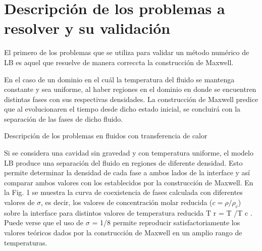 ﻿\chapter{Descripción de los problemas a resolver y su validación}
\graphicspath{{figs/cap4/}}
\label{cap4}

El primero de los problemas que se utiliza para validar un método numérico de LB es aquel que resuelve de manera correccta la construcción de Maxwell.

En el caso de un dominio en el cuál la temperatura del fluido se mantenga constante y sea uniforme, al haber regiones en el dominio en donde se encuentren distintas fases con sus respectivas densidades. La construcción de Maxwell predice que al evolucionaren el tiempo desde dicho estado inicial, se concluirá con la separación de las fases de dicho fluido.



Descripción de los problemas en fluidos con transferencia de calor

Si se considera una cavidad sin gravedad y con temperatura uniforme, el modelo LB produce
una separación del fluido en regiones de diferente densidad. Esto permite determinar la densidad
de cada fase a ambos lados de la interface y así comparar ambos valores con los establecidos
por la construcción de Maxwell. En la Fig. 1 se muestra la curva de coexistencia de fases
calculada con diferentes valores de $\sigma$, es decir, los valores de concentración molar reducida
($c = \rho/\rho_c $) sobre la interface para distintos valores de temperatura reducida T r = T /T c . Puede
verse que el uso de $\sigma$ = 1/8 permite reproducir satisfactoriamente los valores teóricos dados
por la construcción de Maxwell en un amplio rango de temperaturas.




